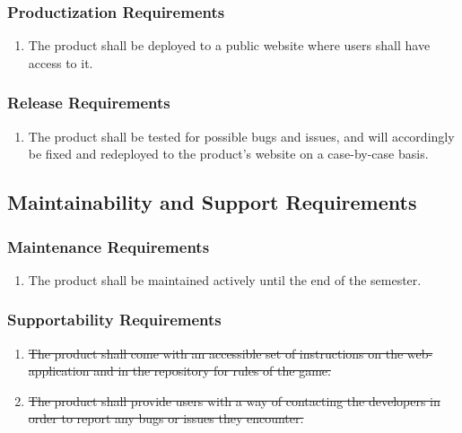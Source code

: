 \documentclass[12pt, titlepage]{article}
\begin{document}
    \subsubsection{Productization Requirements}
    \begin{enumerate}[{OE}1., leftmargin=2\parindent, resume]
    	\item The product shall be deployed to a public website where users shall have access to it.
    \end{enumerate}
    
    \subsubsection{Release Requirements}
    \begin{enumerate}[{OE}1., leftmargin=2\parindent, resume]
    	\item The product shall be tested for possible bugs and issues, and will accordingly be fixed and redeployed to the product's website on a case-by-case basis. 
    \end{enumerate}
    
    
    \subsection{Maintainability and Support Requirements}
    
    \subsubsection{Maintenance Requirements}
    \begin{enumerate}[{MS}1., leftmargin=2\parindent]
    	\item The product shall be maintained actively until the end of the semester.
    \end{enumerate}
    
    \subsubsection{Supportability Requirements}
    \begin{enumerate}[{MS}1., leftmargin=2\parindent, resume]
        \item \sout{The product shall come with an accessible set of instructions on the web-application and in the repository for rules of the game.}
        \item \sout{The product shall provide users with a way of contacting the developers in order to report any bugs or issues they encounter.}
    \end{enumerate}
\end{document}
